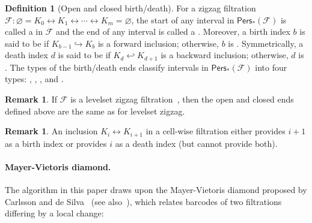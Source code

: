 \documentclass[letterpaper,11pt]{article}
\theoremstyle{mythmstyle}
\theoremstyle{mydefstyle}
\newtheorem{definition}{Definition}
\newtheorem{remark}{Remark}
\theoremstyle{plain}
\theoremstyle{definition}
\newtheorem{definition}[theorem]{Definition}
\newtheorem{remark}[theorem]{Remark}
\newcommand{\Pers}{\mathsf{Pers}}
\newcommand{\<}[1]{\langle #1\rangle}
\newcommand{\incto}{\hookrightarrow}
\newcommand{\bakincto}{\hookleftarrow}
\let\emptyset\varnothing
\newcommand{\Fcal}{\mathcal{F}}
\newcommand{\birth}{b}
\newcommand{\death}{d}
\newcommand{\filtcnt}{m}
\begin{document}
\begin{definition}[Open and closed birth/death]
\label{dfn:open-close-bd}
For a zigzag filtration
$\Fcal: \emptyset=K_0 \leftrightarrow K_1 \leftrightarrow 
\cdots \leftrightarrow K_\filtcnt=\emptyset$,
the start of any interval in $\Pers_*(\Fcal)$ 
is called a 
in $\Fcal$
and the end of any interval is called a .
Moreover, 
a birth index $\birth$ is said to be  
if $K_{\birth-1}\incto K_\birth$ is a forward inclusion;
otherwise, $\birth$ is  .
Symmetrically, 
a death index $\death$ is said to be  
if $K_{\death}\bakincto K_{\death+1}$ is a backward inclusion;
otherwise, $\death$ is  .
The types of the birth/death ends
classify intervals in $\Pers_*(\Fcal)$ into four types: 
, , , and . 
\end{definition}
\begin{remark}
If $\Fcal$ is a levelset zigzag filtration~\cite{carlsson2009zigzag-realvalue},
then the open and closed ends defined above are the same as
for levelset zigzag.
\end{remark}

\begin{remark}\label{rmk:inc-bd}
An inclusion $K_i\leftrightarrow K_{i+1}$ in a cell-wise filtration 
either provides $i+1$ as a birth index
or provides $i$ as a death index (but cannot provide both).
\end{remark}



\paragraph{Mayer-Vietoris diamond.}

The algorithm in this paper
draws upon the Mayer-Vietoris diamond proposed by Carlsson and de Silva~\cite{carlsson2010zigzag}
(see also~\cite{carlsson2019parametrized,carlsson2009zigzag-realvalue}),
which relates barcodes of two filtrations
differing by a local change:
\end{document}

